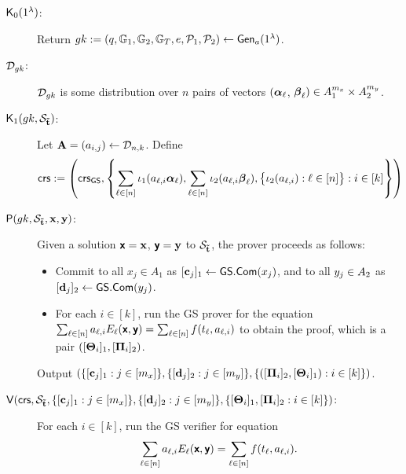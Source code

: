 \begin{description}
\item[$\mathsf{K}_0(1^\lambda)$:]  Return ${gk} := (q,\mathbb{G}_1,\mathbb{G}_2,\mathbb{G}_T,e,\mathcal{P}_1,\mathcal{P}_2) \leftarrow \mathsf{Gen}_a(1^{\lambda})$.

\item[$\mathcal{D}_{gk}$:] $\mathcal{D}_{gk}$ is some distribution over $n$ pairs of vectors  $({\boldsymbol \alpha}_{\ell}$, ${\boldsymbol \beta}_{\ell}) \in A_1^{m_x} \times A_2^{m_y}$.

\item[$\mathsf{K}_1({gk}, \mathcal{S}_{\mathbf{\tilde{t}}})$:]
Let $\mathbf{{A}}=(a_{i,j}) \gets \mathcal{D}_{n,k}$. Define 
$$\mathsf{crs}:=\left(\mathsf{crs}_{{\mathsf{GS}}}, \left\{\sum_{\ell\in[n]}\iota_1(a_{\ell,i} {\boldsymbol \alpha}_\ell), \sum_{\ell\in[n]} \iota_2(a_{\ell,i} {\boldsymbol \beta}_\ell), \big\{\iota_{2}(a_{\ell,i}): \ell \in [n]\big\}: i \in [k]\right\}\right)$$
\item[$\mathsf{P}({gk}, \mathcal{S}_{\mathbf{\tilde{t}}},\mathbf{x},\mathbf{y})$:] 
Given a solution $\textbf{\textsf{x}}=\mathbf{x}$,  $\textbf{\textsf{y}}=\mathbf{y}$ to $\mathcal{S}_{\mathbf{\tilde{t}}}$, the prover proceeds as follows:
\begin{itemize}
\item Commit to all $x_j \in A_1$ as $[\mathbf{c}_j]_1\gets\mathsf{GS.Com}(x_j)$, and to all 
$y_j\in A_2$ as $[\mathbf{d}_j]_2\gets\mathsf{GS.Com}(y_j)$.

\item For each $i \in [k]$, run the GS prover for the equation $\sum_{\ell\in[n]} a_{\ell,i} E_{\ell}(\textbf{\textsf{x}},\textbf{\textsf{y}})= \sum_{\ell \in [n]} f(t_{\ell}, a_{\ell,i})$ to obtain the proof, which is a pair  $([\mathbf{{\Theta}}_i]_1,[\mathbf{{\Pi}}_i]_2)$.
\end{itemize}
Output 
$(\{[\mathbf{c}_j]_1 : j \in [m_x]\}, \{[\mathbf{d}_j]_2: j \in [m_y]\}, \{([\mathbf{{\Pi}}_{i}]_2,[\mathbf{{\Theta}}_{i}]_1) : i \in [k]\})$.
\item[$\mathsf{V}(\mathsf{crs},\mathcal{S}_{\mathbf{\tilde{t}}},{\{[\mathbf{c}_j]_1 : j\in[m_x]\},\{[\mathbf{d}_j]_2:j\in[m_y]\}, \{[\mathbf{{\Theta}}_{i}]_1,[\mathbf{{\Pi}}_{i}]_2:i \in [k]\}})$:] For each $i \in [k]$, run the GS verifier for equation
$$\sum_{\ell\in[n]} a_{\ell,i} E_{\ell}(\textbf{\textsf{x}},\textbf{\textsf{y}})= \sum_{\ell \in [n]} f(t_{\ell}, a_{\ell,i}).$$
\end{description}  

